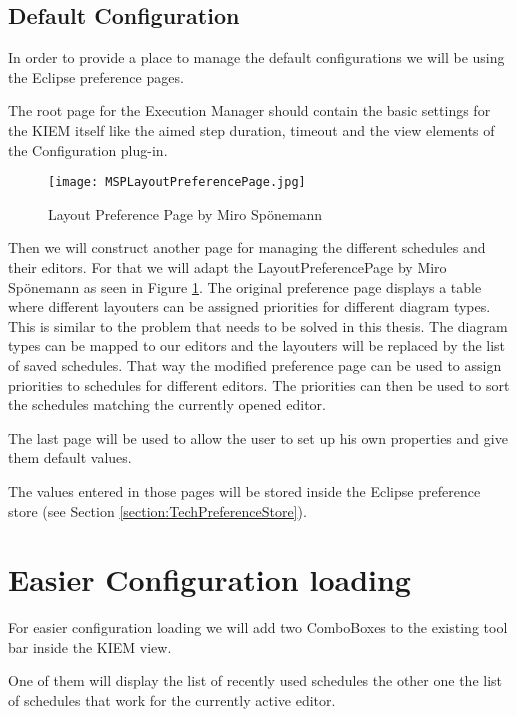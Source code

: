 \subsection{Default Configuration}
\label{section:ConfConceptsDefaultConf}
In order to provide a place to manage the default configurations we will be
using the Eclipse preference pages.

The root page for the Execution Manager should contain the basic settings for the \ac{KIEM} itself like
the aimed step duration, timeout and the view elements of the Configuration plug-in.

\begin{figure}[MSPLayoutPreferencePage]
  \centering
  \texttt{[image: MSPLayoutPreferencePage.jpg]}
  \caption[Layout Preference Page by Miro Sp\"onemann]%
  {Layout Preference Page by Miro Sp\"onemann\protect}
  \label{fig:MSPLayoutPreferencePage}
\end{figure}

Then we will construct another page for managing the different schedules
and their editors. For that we will adapt the LayoutPreferencePage by Miro Sp\"onemann
as seen in Figure \ref{fig:MSPLayoutPreferencePage}. The original preference page
displays a table where different layouters can be assigned priorities for different diagram
types. This is similar to the problem that needs to be solved in this thesis. The diagram types
can be mapped to our editors and the layouters will be replaced by the list of saved schedules.
That way the modified preference page can be used to assign priorities to schedules for
different editors. The priorities can then be used to sort the schedules matching
the currently opened editor.

The last page will be used to allow the user to set up his own properties and give them
default values.

The values entered in those pages will be stored inside the Eclipse preference
store (see Section \ref{section:TechPreferenceStore}).

\section{Easier Configuration loading}
\label{section:ConfConceptsEasyLoading}
For easier configuration loading we will add two ComboBoxes to the existing
tool bar inside the \ac{KIEM} view.

One of them will display the list of recently used schedules the other one the
list of schedules that work for the currently active editor.

